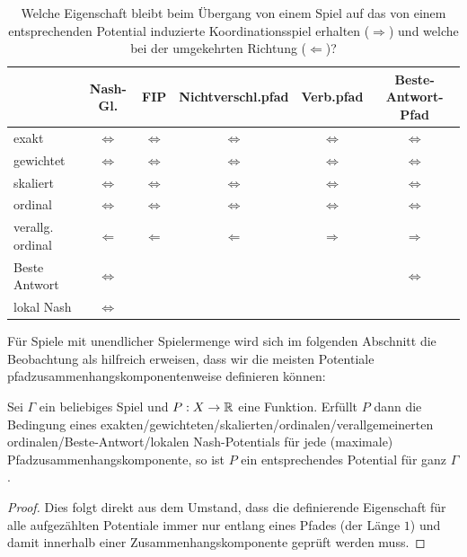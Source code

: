 \begin{table}[h]\centering
	\begin{tabular}{l|ccccc}
						& Nash-Gl. 			& FIP 					& Nichtverschl.pfad 			& Verb.pfad 		& Beste-Antwort-Pfad \\\hline
		exakt			& $\Leftrightarrow$	& $\Leftrightarrow$ 	& $\Leftrightarrow$				& $\Leftrightarrow$	& $\Leftrightarrow$ \\
		gewichtet		& $\Leftrightarrow$	& $\Leftrightarrow$ 	& $\Leftrightarrow$				& $\Leftrightarrow$	& $\Leftrightarrow$ \\		
		skaliert		& $\Leftrightarrow$ & $\Leftrightarrow$ 	& $\Leftrightarrow$				& $\Leftrightarrow$	& $\Leftrightarrow$ \\
		ordinal			& $\Leftrightarrow$	& $\Leftrightarrow$ 	& $\Leftrightarrow$				& $\Leftrightarrow$	& $\Leftrightarrow$ \\
		verallg. ordinal& $\Leftarrow$		& $\Leftarrow$		 	& $\Leftarrow$					& $\Rightarrow$		& $\Rightarrow$ 	\\
		Beste Antwort	& $\Leftrightarrow$	& 					 	& 								& 					& $\Leftrightarrow$ \\
		lokal Nash		& $\Leftrightarrow$	& 					 	& 								& 					& 					
	\end{tabular}	
	\caption{Welche Eigenschaft bleibt beim Übergang von einem Spiel auf das von einem entsprechenden Potential induzierte Koordinationsspiel erhalten ($\Rightarrow$) und welche bei der umgekehrten Richtung ($\Leftarrow$)?}\label{tab:PotErhalten}
\end{table}

Für Spiele mit unendlicher Spielermenge wird sich im folgenden Abschnitt die Beobachtung als hilfreich erweisen, dass wir die meisten Potentiale pfadzusammenhangskomponentenweise definieren können:

\begin{beob}\label{beob:KompWeisePotentiale}
	Sei $\Gamma$ ein beliebiges Spiel und $P: X \to \mathbb{R}$ eine Funktion. Erfüllt $P$ dann die Bedingung eines exakten/gewichteten/skalierten/ordinalen/verallgemeinerten ordinalen/Beste-Antwort/lokalen Nash-Potentials für jede (maximale) Pfadzusammenhangskomponente, so ist $P$ ein entsprechendes Potential für ganz $\Gamma$.
\end{beob}

\begin{proof}
	Dies folgt direkt aus dem Umstand, dass die definierende Eigenschaft für alle aufgezählten Potentiale immer nur entlang eines Pfades (der Länge $1$) und damit innerhalb einer Zusammenhangskomponente geprüft werden muss.
\end{proof}


